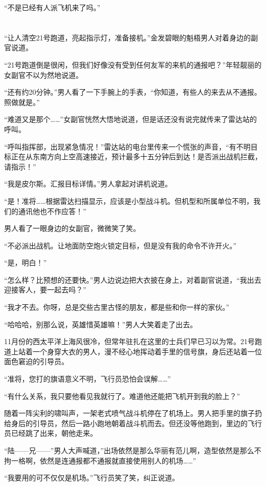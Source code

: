 “不是已经有人派飞机来了吗。”
\section*{}

“让人清空21号跑道，亮起指示灯，准备接机。”金发碧眼的魁梧男人对着身边的副官说道。

“21号跑道倒是很闲，但我们好像没有受到任何友军的来机的通报吧？”年轻靓丽的女副官不以为然地说道。

“还有约20分钟。”男人看了一下手腕上的手表，“你知道，有些人的来去从不通报。照做就是。”

“难道又是那个……”女副官恍然大悟地说道，但是话还没有说完就传来了雷达站的呼叫。

“呼叫指挥部，出现紧急情况！”雷达站的电台里传来一个慌张的声音，“有不明目标正在从东南方向上空高速接近，预计最多十五分钟后到达！是否派出战机拦截，请指示！”

“我是皮尔斯。汇报目标详情。”男人拿起对讲机说道。

“是！准将……根据雷达扫描显示，应该是小型战斗机。但机型和所属单位不明，我们的通讯他也不作应答！”

男人看了一眼身边的女副官，微微笑了笑。

“不必派出战机。让地面防空炮火锁定目标，但是没有我的命令不许开火。”

“是，明白！”

“怎么样？比预想的还要快。”男人边说边把大衣披在身上，对着副官说道，“我出去迎接客人，要一起去吗？”

“我才不去。你呀，总是交些古里古怪的朋友，都是些和你一样的家伙。”

“哈哈哈，别那么说，英雄惜英雄嘛！”男人大笑着走了出去。

11月份的西太平洋上海风很冷，但常年驻扎在这里的士兵们早已习以为常。21号跑道上站着一个身穿大衣的男人，漫不经心地挥动着手里的信号旗，身后还站着一位面色窘迫的引导员。

“准将，您打的旗语意义不明，飞行员恐怕会误解……”

“有什么关系，我只要他看见我就行了。难道他还能把飞机开到我的脸上？”

随着一阵尖利的啸叫声，一架老式喷气战斗机停在了机场上。男人把手里的旗子扔给身后的引导员，然后一路小跑地朝着战斗机而去。但还没等他跑到，里边的飞行员已经跳了出来，朝他走来。

“陆——兄——”男人大声喊道，”出场依然是那么华丽有范儿啊，造型依然是那么不拘一格啊，依然是连通报都不通报就直接使用别人的机场……”

“我要用的可不仅仅是机场。”飞行员笑了笑，纠正说道。

